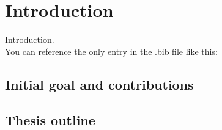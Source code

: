 \chapter{Introduction}
Introduction.\\
You can reference the only entry in the .bib file like this: \cite{Arenas2009}

\section{Initial goal and contributions}


\section{Thesis outline}

